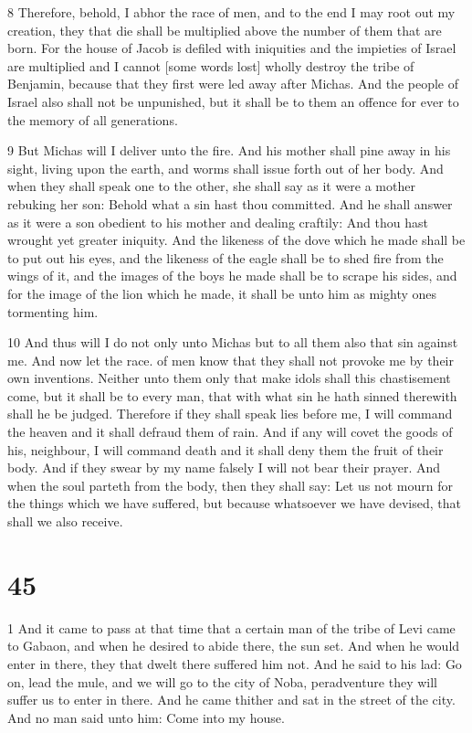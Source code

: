 \par 8 Therefore, behold, I abhor the race of men, and to the end I may root out my creation, they that die shall be multiplied above the number of them that are born. For the house of Jacob is defiled with iniquities and the impieties of Israel are multiplied and I cannot [some words lost] wholly destroy the tribe of Benjamin, because that they first were led away after Michas. And the people of Israel also shall not be unpunished, but it shall be to them an offence for ever to the memory of all generations. 

\par 9 But Michas will I deliver unto the fire. And his mother shall pine away in his sight, living upon the earth, and worms shall issue forth out of her body. And when they shall speak one to the other, she shall say as it were a mother rebuking her son: Behold what a sin hast thou committed. And he shall answer as it were a son obedient to his mother and dealing craftily: And thou hast wrought yet greater iniquity. And the likeness of the dove which he made shall be to put out his eyes, and the likeness of the eagle shall be to shed fire from the wings of it, and the images of the boys he made shall be to scrape his sides, and for the image of the lion which he made, it shall be unto him as mighty ones tormenting him. 

\par 10 And thus will I do not only unto Michas but to all them also that sin against me. And now let the race. of men know that they shall not provoke me by their own inventions. Neither unto them only that make idols shall this chastisement come, but it shall be to every man, that with what sin he hath sinned therewith shall he be judged. Therefore if they shall speak lies before me, I will command the heaven and it shall defraud them of rain. And if any will covet the goods of his, neighbour, I will command death and it shall deny them the fruit of their body. And if they swear by my name falsely I will not bear their prayer. And when the soul parteth from the body, then they shall say: Let us not mourn for the things which we have suffered, but because whatsoever we have devised, that shall we also receive. 

\chapter{45}

\par 1 And it came to pass at that time that a certain man of the tribe of Levi came to Gabaon, and when he desired to abide there, the sun set. And when he would enter in there, they that dwelt there suffered him not. And he said to his lad: Go on, lead the mule, and we will go to the city of Noba, peradventure they will suffer us to enter in there. And he came thither and sat in the street of the city. And no man said unto him: Come into my house. 

